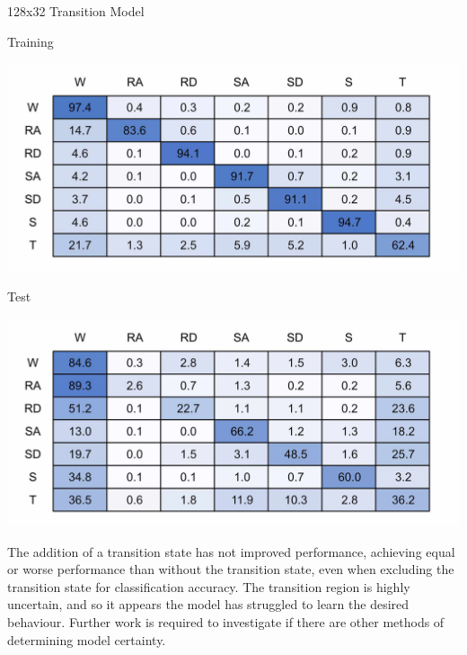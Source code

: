 \documentclass[sensors,article,submit,moreauthors,pdftex]{Definitions/mdpi}
\begin{document}
\begin{table}[!hbt]
    \centering
    \caption{128x32 Transition Model}
    \label{tab:128x32_transition_confusion_matrix}
    \begin{subtable}{.45\textwidth}
        \centering
        \caption{Training}
        \label{tab:tran_model_conf_matrix_training_128x32}
        \includegraphics[width=\textwidth]{Figures/results/conf_matricies/Training_128x32_T.jpg}
    \end{subtable}
    \hfil
    \begin{subtable}{.45\textwidth}
        \centering
        \caption{Test}
        \label{tab:tran_model_conf_matrix_test_128x32}
        \includegraphics[width=\textwidth]{Figures/results/conf_matricies/Test_128x32_T.jpg}
    \end{subtable}
\end{table}

The addition of a transition state has not improved performance, achieving equal or worse performance than without the transition state, even when excluding the transition state for classification accuracy. The transition region is highly uncertain, and so it appears the model has struggled to learn the desired behaviour. Further work is required to investigate if there are other methods of determining model certainty.
\end{document}

